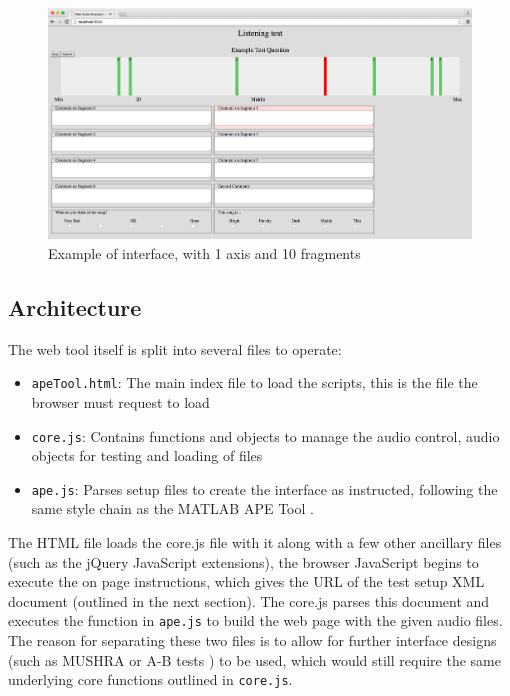 \documentclass{article}
\begin{document}
\begin{figure}[htbp]
\begin{center}
\includegraphics[width=\textwidth]{interface.png}
\caption{Example of interface, with 1 axis and 10 fragments}
\label{fig:interface}
\end{center}
\end{figure}



\subsection{Architecture}\label{sec:architecture}

The web tool itself is split into several files to operate:
\begin{itemize}
\item \texttt{apeTool.html}: The main index file to load the scripts, this is the file the browser must request to load
\item \texttt{core.js}: Contains functions and objects to manage the audio control, audio objects for testing and loading of files
\item \texttt{ape.js}: Parses setup files to create the interface as instructed, following the same style chain as the MATLAB APE Tool \cite{deman2014b}.
\end{itemize}

The HTML file loads the core.js file with it along with a few other ancillary files (such as the jQuery JavaScript extensions), the browser JavaScript begins to execute the on page instructions, which gives the URL of the test setup XML document (outlined in the next section). The core.js parses this document and executes the function in \texttt{ape.js} to build the web page with the given audio files. The reason for separating these two files is to allow for further interface designs (such as MUSHRA \cite{mushra} or A-B tests \cite{bech}) to be used, which would still require the same underlying core functions outlined in \texttt{core.js}.
\end{document}
